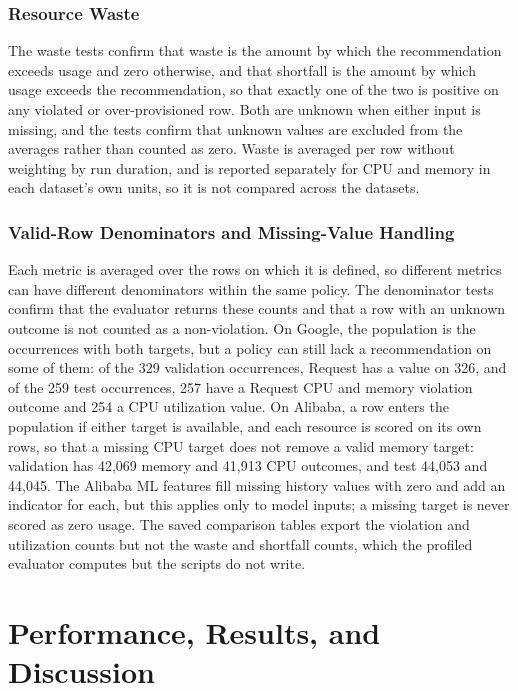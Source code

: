 \documentclass{IEEEtran}
\begin{document}
\subsubsection{Resource Waste}\label{sec:6.4.2}

The waste tests confirm that waste is the amount by which the recommendation exceeds usage and zero otherwise, and that shortfall is the amount by which usage exceeds the recommendation, so that exactly one of the two is positive on any violated or over-provisioned row. Both are unknown when either input is missing, and the tests confirm that unknown values are excluded from the averages rather than counted as zero. Waste is averaged per row without weighting by run duration, and is reported separately for CPU and memory in each dataset's own units, so it is not compared across the datasets.

\subsubsection{Valid-Row Denominators and Missing-Value Handling}\label{sec:6.4.3}

Each metric is averaged over the rows on which it is defined, so different metrics can have different denominators within the same policy. The denominator tests confirm that the evaluator returns these counts and that a row with an unknown outcome is not counted as a non-violation. On Google, the population is the occurrences with both targets, but a policy can still lack a recommendation on some of them: of the 329 validation occurrences, Request has a value on 326, and of the 259 test occurrences, 257 have a Request CPU and memory violation outcome and 254 a CPU utilization value. On Alibaba, a row enters the population if either target is available, and each resource is scored on its own rows, so that a missing CPU target does not remove a valid memory target: validation has 42,069 memory and 41,913 CPU outcomes, and test 44,053 and 44,045. The Alibaba ML features fill missing history values with zero and add an indicator for each, but this applies only to model inputs; a missing target is never scored as zero usage. The saved comparison tables export the violation and utilization counts but not the waste and shortfall counts, which the profiled evaluator computes but the scripts do not write.

\section{Performance, Results, and Discussion}\label{sec:7}
\end{document}
